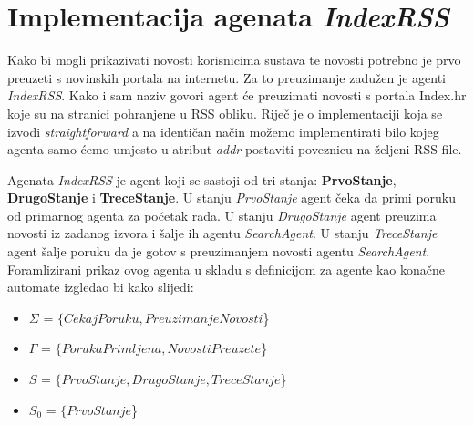 \documentclass[]{foi} %
\begin{document}
\section{Implementacija agenata \textit{IndexRSS}}
Kako bi mogli prikazivati novosti korisnicima sustava te novosti potrebno je prvo preuzeti s novinskih portala na internetu. Za to preuzimanje zadužen je agenti \textit{IndexRSS}. Kako i sam naziv govori agent će preuzimati novosti s portala Index.hr koje su na stranici pohranjene u RSS obliku. Riječ je o implementaciji koja se izvodi \textit{straightforward} a na  identičan način možemo implementirati bilo kojeg agenta samo ćemo umjesto u atribut \textit{addr} postaviti poveznicu na željeni RSS file.

Agenata \textit{IndexRSS} je agent koji se sastoji od tri stanja: \textbf{PrvoStanje}, \textbf{DrugoStanje} i \textbf{TreceStanje}. U stanju \textit{PrvoStanje} agent čeka da primi poruku od primarnog agenta za početak rada. U stanju \textit{DrugoStanje} agent preuzima novosti iz zadanog izvora i šalje ih agentu \textit{SearchAgent}. U stanju \textit{TreceStanje} agent šalje poruku da je gotov s preuzimanjem novosti agentu \textit{SearchAgent}.
Foramlizirani prikaz ovog agenta u skladu s definicijom za agente kao konačne automate izgledao bi kako slijedi:

\begin{itemize}
  \item \(\Sigma\) = $\{CekajPoruku, PreuzimanjeNovosti$\}
  \item \(\Gamma\) = $\{PorukaPrimljena, NovostiPreuzete$\}
  \item \(S\) = $\{PrvoStanje, DrugoStanje, TreceStanje$\}
  \item \(S_0\) = $\{PrvoStanje$\}
\end{itemize}
\end{document}

